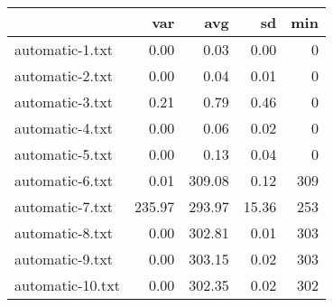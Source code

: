 \begin{tabular}{lrrrr}
  \toprule  & var & avg & sd & min \\ 
  \midrule automatic-1.txt & 0.00 & 0.03 & 0.00 & 0 \\ 
  automatic-2.txt & 0.00 & 0.04 & 0.01 & 0 \\ 
  automatic-3.txt & 0.21 & 0.79 & 0.46 & 0 \\ 
  automatic-4.txt & 0.00 & 0.06 & 0.02 & 0 \\ 
  automatic-5.txt & 0.00 & 0.13 & 0.04 & 0 \\ 
  automatic-6.txt & 0.01 & 309.08 & 0.12 & 309 \\ 
  automatic-7.txt & 235.97 & 293.97 & 15.36 & 253 \\ 
  automatic-8.txt & 0.00 & 302.81 & 0.01 & 303 \\ 
  automatic-9.txt & 0.00 & 303.15 & 0.02 & 303 \\ 
  automatic-10.txt & 0.00 & 302.35 & 0.02 & 302 \\ 
   \bottomrule \end{tabular}
